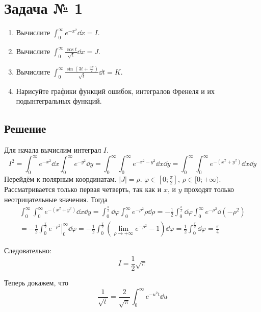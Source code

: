 \section{Задача № 1}

\begin{enumerate}
\item Вычислите \(\int_{0}^{\infty} e^{-x^2} \dd x = I\).
\item Вычислите \(\int_{0}^{\infty} \frac{\cos t}{\sqrt{t}} \dd x = J\).
\item Вычислите
  \(\int_{0}^{\infty} \frac{\sin(3t + \frac{3\pi}{2})}{\sqrt{t}} \dd t = K\).
\item Нарисуйте графики функций ошибок, интегралов Френеля
  и их подынтегральных функций.
\end{enumerate}

\subsection{Решение}

Для начала вычислим интеграл \(I\).
\[
  I^2 = \int_{0}^{\infty} e^{-x^2} \dd x \int_{0}^{\infty} e^{-y^2} \dd y
  = \int_{0}^{\infty} \int_{0}^{\infty} e^{-x^2-y^2} \dd x \dd y
  = \int_{0}^{\infty} \int_{0}^{\infty} e^{-(x^2+y^2)} \dd x \dd y
\]
Перейдём к полярным координатам. \(|J| = \rho\).
\(\varphi \in [0; \frac{\pi}{2}]\), \(\rho \in [0;+\infty)\).
Рассматривается только первая четверть, так как и \(x\), и \(y\)
проходят только неотрицательные значения.
Тогда
\[
\begin{split}
  \int_{0}^{\infty} \int_{0}^{\infty} e^{-(x^2+y^2)} \dd x \dd y
  = \int_{0}^{\frac{\pi}{2}} \dd \varphi \int_{0}^{\infty} e^{-\rho^2} \rho \dd \rho
  = -\frac{1}{2} \int_{0}^{\frac{\pi}{2}} \dd \varphi \int_{0}^{\infty} e^{-\rho^2} \dd(-\rho^2) \\
  = -\frac{1}{2} \int_{0}^{\frac{\pi}{2}} \left. e^{-\rho^2}\right\rvert_{0}^{\infty}\dd \varphi
  = -\frac{1}{2} \int_{0}^{\frac{\pi}{2}}
    \left( \lim_{\rho \to +\infty} e^{-\rho^2} - 1 \right) \dd \varphi
  = \frac{1}{2} \int_{0}^{\frac{\pi}{2}} \dd \varphi
  = \frac{\pi}{4}
\end{split}
\]

Следовательно:
\[ I = \frac{1}{2}\sqrt{\pi} \]

Теперь докажем, что
\begin{equation}\label{eq:01-sqrtt}
  \frac{1}{\sqrt{t}} = \frac{2}{\sqrt{\pi}} \int_{0}^{\infty} e^{-u^2 t} \dd u
\end{equation}

